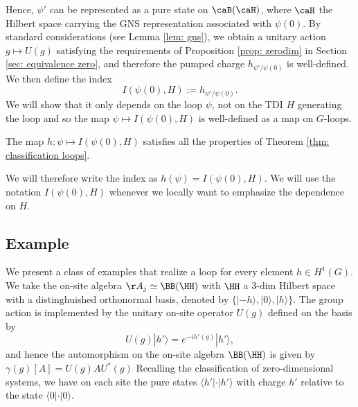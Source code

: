 Hence, $\psi'$ can be represented as a pure state on $\caB(\caH)$, where $\caH$ the Hilbert space carrying the GNS representation associated with $\psi(0)$. By standard considerations (see Lemma \ref{lem: gns}), we obtain a unitary action $g\mapsto U(g)$ satisfying the requirements of Proposition \ref{prop: zerodim} in Section \ref{sec: equivalence zero},  and therefore  the pumped charge $h_{\psi'/{\psi(0)}}$ is well-defined. We then define the index
$$
I(\psi(0),H):=h_{\psi'/{\psi(0)}}.
$$
We will show that it only depends on the loop $\psi$, not on the TDI $H$ generating the loop and so the map $\psi \mapsto I(\psi(0),H) $ is well-defined as a map on $G$-loops.
\begin{theorem}\label{thm: pump index}
	The map $h : \psi \mapsto I(\psi(0),H) $ satisfies all the properties of Theorem \ref{thm: classification loops}.
\end{theorem}
We will therefore write the index as $h(\psi)=I(\psi(0),H)$. We will use the notation $I(\psi(0), H)$ whenever we locally want to emphasize the dependence on $H$.






\subsection{Example}\label{sec: examples}
We present a class of examples that realize a loop for every element $ h \in H^1(G)$.
We take the on-site algebra $\AA_j\simeq \BB(\HH)$ with  $\HH$ a $3$-dim Hilbert space with a distinghuished orthonormal basis, denoted by $\{|-h\rangle,  | 0\rangle,  |h\rangle\}$. The group action is implemented by the unitary on-site operator $U(g)$ defined on the basis by 
\begin{equation}
	U(g) | h'\rangle = e^{-i h'(g)}| h'\rangle,
\end{equation}
and hence the automorphism on the on-site algebra $\BB(\HH)$ is given by $\gamma(g)[A]=U(g)AU^*(g)$
Recalling the classification of zero-dimensional systems, we have on each site the pure states $\langle h'| \cdot |h'\rangle$ with charge $h'$ relative to the state $\langle 0| \cdot |0\rangle$. 

